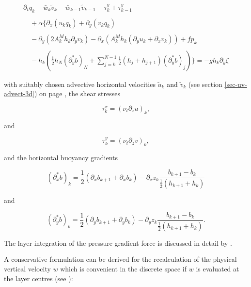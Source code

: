 \begin{equation}\label{vEqvi}
\begin{array}{l}
\partial_t q_k 
+\bar w_k  \tilde v_k -\bar w_{k-1}  \tilde v_{k-1} 
-\tau^y_k + \tau^y_{k-1} 
\\ \\ \quad
+\alpha\Bigg\{\partial_x(u_kq_k)+\partial_y(v_kq_k)
\\ \\ \displaystyle \quad 
-\partial_y\left(2A_k^Mh_k\partial_yv_k\right)-\partial_x\left(A_k^Mh_k
(\partial_yu_k+\partial_xv_k)\right)
+ fp_k 
\\ \\ \quad
\displaystyle
-h_k\left(
\frac12h_N(\partial^*_yb)_N
+\sum_{j=k}^{N-1}\frac12(h_j+h_{j+1})(\partial^*_yb)_j
\right)\Bigg\}
=
-gh_k\partial_y\zeta
\end{array}
\end{equation}

with suitably chosen advective horizontal 
velocities $\tilde u_k$ and $\tilde v_k$
(see section \ref{sec-uv-advect-3d}) on page \pageref{sec-uv-advect-3d}, 
the shear stresses

\begin{equation}\label{tauxkdef}
\tau^x_k = \left(\nu_t \partial_z u \right)_k,
\end{equation}

and 

\begin{equation}\label{tauykdef}
\tau^y_k = \left(\nu_t \partial_z v \right)_k,
\end{equation}

and the horizontal buoyancy gradients

\begin{equation}
(\partial^*_xb)_k=\frac12(\partial_xb_{k+1}+\partial_x b_k)
-\partial_xz_k\frac{b_{k+1}-b_k}{\frac12(h_{k+1}+h_k)}
\end{equation}

and 

\begin{equation}
(\partial^*_yb)_k=\frac12(\partial_yb_{k+1}+\partial_y b_k)
-\partial_yz_k\frac{b_{k+1}-b_k}{\frac12(h_{k+1}+h_k)}.
\end{equation}

The layer integration of the pressure gradient force 
is discussed in detail by \cite{BURCHARDea97}.

A conservative formulation can be derived 
for the recalculation of the physical vertical velocity
$w$ which is convenient
in the discrete space if $w$ is evaluated at the layer centres
(see \cite{DELEERSNIJDERea92}):

